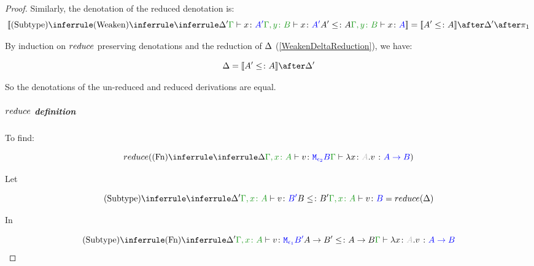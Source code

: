 \documentclass{report}
\begin{document}
\begin{framed}
\begin{proof}
                Similarly, the denotation of the reduced denotation is:
                \begin{equation}
                    \deno{\ntreeruleII{Subtype}{
                        \ntreeruleI{Weaken}{
                            \treeruleI{\D'}{\gtyperelation{x}{A'}}
                        } {
                            \typerelation{\gby}{x}{A'}
                        }
                        }{
                        A' \subtype A
                        }{\typerelation{\gby}{x}{A}}} = \deno{A'\subtype A}\after \D' \after \p
                \end{equation}
        
        
                By induction on $reduce$ preserving denotations and the reduction of $\Delta$ (\ref{WeakenDeltaReduction}), we have:
        
                \begin{equation}
                    \D = \deno{A' \subtype A}\after\D'
                \end{equation}
        
                So the denotations of the un-reduced and reduced derivations are equal.
        
                \subparagraph{$reduce$ definition}
                    To find:
                
                    \begin{equation}
                        \reduce(\ntreeruleI{Fn}{
                            \treeruleI{\D}{\typerelation{\gax}{v}{\M{\e_2}{B}}}
                        }{\gtyperelation{\lam{x}{A}{v}}{\ab}})
                    \end{equation}
        
                    Let 
        
                    \begin{equation}
                        \ntreeruleII{Subtype}{
                            \treeruleI{\D'}{\typerelation{\gax}{v}{B'}}
                            }{B\subtype B'}{
                            \typerelation{\gax}{v}{B}
                        } = \reduce(\D)
                    \end{equation}
        
                    In
        
                    \begin{equation}
                        \ntreeruleII{Subtype}{
                            \ntreeruleI{Fn}{
                                \D'
                            }{
                                \typerelation{\gax}{v}{\M{\e_1}{B'}}
                            }
                            }{
                            \fntype{A}{B'}\subtype\ab
                        } {
                            \gtyperelation{\lam{x}{A}{v}}{\ab}
                        }
                    \end{equation}
        

\end{proof}
\end{framed}
\end{document}
